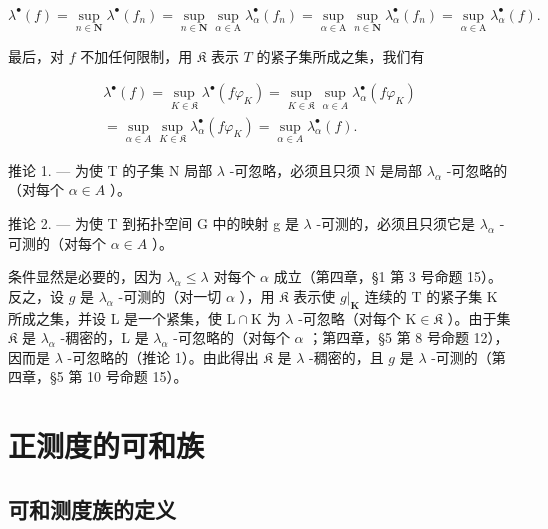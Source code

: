 \[
\lambda^ {\bullet} (f) = \sup _ {n \in \mathbf {N}} \lambda^ {\bullet} (f _ {n}) = \sup _ {n \in \mathbf {N}} \sup _ {\alpha \in \mathrm{A}} \lambda_ {\alpha} ^ {\bullet} (f _ {n}) = \sup _ {\alpha \in \mathrm{A}} \sup _ {n \in \mathbf {N}} \lambda_ {\alpha} ^ {\bullet} (f _ {n}) = \sup _ {\alpha \in \mathrm{A}} \lambda_ {\alpha} ^ {\bullet} (f).
\]

最后，对 \(f\) 不加任何限制，用 \(\mathfrak{K}\) 表示 \(T\) 的紧子集所成之集，我们有

\[
\begin{array}{c} \lambda^ {\bullet} (f) = \sup _ {K \in \mathfrak {K}} \lambda^ {\bullet} (f \varphi_ {K}) = \sup _ {K \in \mathfrak {K}} \sup _ {\alpha \in A} \lambda_ {\alpha} ^ {\bullet} (f \varphi_ {K}) \\ = \sup _ {\alpha \in A} \sup _ {K \in \mathfrak {K}} \lambda_ {\alpha} ^ {\bullet} (f \varphi_ {K}) = \sup _ {\alpha \in A} \lambda_ {\alpha} ^ {\bullet} (f). \end{array}
\]

推论 1. --- 为使 T 的子集 N 局部 \(\lambda\) -可忽略，必须且只须 N 是局部 \(\lambda_{\alpha}\) -可忽略的（对每个 \(\alpha \in A\) ）。

推论 2. --- 为使 T 到拓扑空间 G 中的映射 g 是 \(\lambda\) -可测的，必须且只须它是 \(\lambda_{\alpha}\) -可测的（对每个 \(\alpha \in A\) ）。

条件显然是必要的，因为 \(\lambda_{\alpha} \leqslant \lambda\) 对每个 \(\alpha\) 成立（第四章，§1 第 3 号命题 15）。反之，设 \(g\) 是 \(\lambda_{\alpha}\) -可测的（对一切 \(\alpha\) ），用 \(\mathfrak{K}\) 表示使 \(g|_{\mathbf{K}}\) 连续的 T 的紧子集 K 所成之集，并设 L 是一个紧集，使 \(\mathrm{L} \cap \mathrm{K}\) 为 \(\lambda\) -可忽略（对每个 \(\mathrm{K} \in \mathfrak{K}\) ）。由于集 \(\mathfrak{K}\) 是 \(\lambda_{\alpha}\) -稠密的，L 是 \(\lambda_{\alpha}\) -可忽略的（对每个 \(\alpha\) ；第四章，§5 第 8 号命题 12），因而是 \(\lambda\) -可忽略的（推论 1）。由此得出 \(\mathfrak{K}\) 是 \(\lambda\) -稠密的，且 \(g\) 是 \(\lambda\) -可测的（第四章，§5 第 10 号命题 15）。

\section{正测度的可和族}

\subsection{可和测度族的定义}

